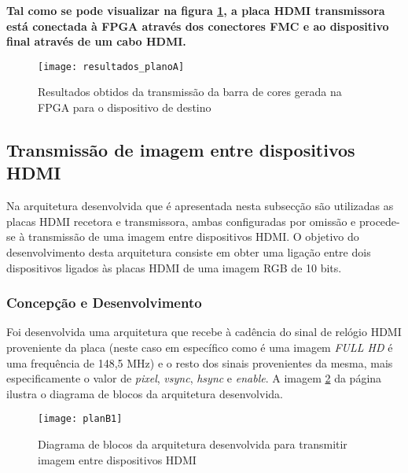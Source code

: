 \textbf{Tal como se pode visualizar na figura \ref{fig:resultados_planoA}, a placa HDMI transmissora está conectada à FPGA através dos conectores FMC e ao dispositivo final através de um cabo HDMI.}

\begin{figure}[h!]
	\begin{center}
		\leavevmode
		\texttt{[image: resultados\_planoA]}
		\caption[Resultados obtidos da transmissão da barra de cores gerada na FPGA para o dispositivo de destino]{Resultados obtidos da transmissão da barra de cores gerada na FPGA para o dispositivo de destino}
		\label{fig:resultados_planoA}
	\end{center}
\end{figure}

\subsection{Transmissão de imagem entre dispositivos HDMI} \label{subsub:planB}

Na arquitetura desenvolvida que é apresentada nesta subsecção são utilizadas as placas HDMI recetora e transmissora, ambas configuradas por omissão e procede-se à transmissão de uma imagem entre dispositivos HDMI. O objetivo do desenvolvimento desta arquitetura consiste em obter uma ligação entre dois dispositivos ligados às placas HDMI de uma imagem RGB de 10 bits.

\subsubsection*{Concepção e Desenvolvimento}

Foi desenvolvida uma arquitetura que recebe à cadência do sinal de relógio HDMI proveniente da placa (neste caso em específico como é uma imagem \textit{FULL HD} é uma frequência de 148,5 MHz) e o resto dos sinais provenientes da mesma, mais especificamente o valor de \textit{pixel}, \textit{vsync}, \textit{hsync} e \textit{enable}. A imagem \ref{fig:planb1} da página \pageref{fig:planb1} ilustra o diagrama de blocos da arquitetura desenvolvida.

\begin{figure}[h!]
	\begin{center}
		\leavevmode
		\texttt{[image: planB1]}
		\caption{Diagrama de blocos da arquitetura desenvolvida para transmitir imagem entre dispositivos HDMI}
		\label{fig:planb1}
	\end{center}
\end{figure}

